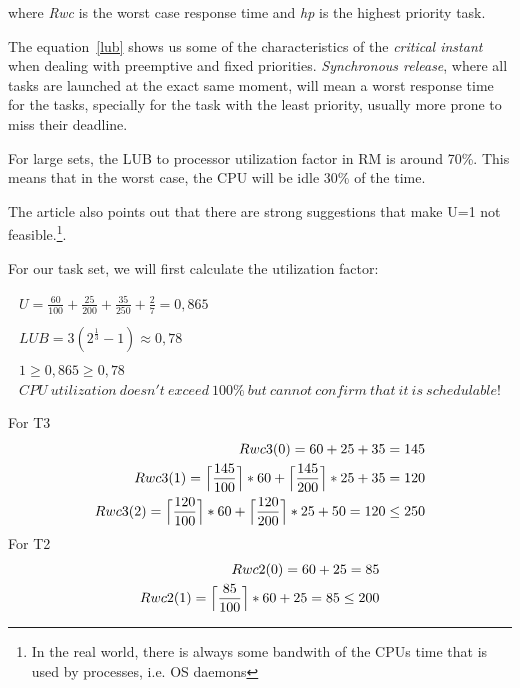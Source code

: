 \documentclass[11pt]{article}
\begin{document}
{\small where \emph{Rwc} is the worst case response time and \emph{hp} is the highest priority task.}
\medskip
\medskip

The equation~\ref{lub} shows us some of the characteristics of the \emph{critical instant} when dealing with preemptive and fixed priorities. \emph {Synchronous release}, where all tasks are launched at the exact same moment, will mean a worst response time for the tasks, specially for the task with the least priority, usually more prone to miss their deadline.

For large sets, the LUB to processor utilization factor in RM is around 70\%. This means that in the worst case, the CPU will be idle 30\% of the time.

The article also points out that there are strong suggestions that make U=1 not feasible.\footnote{In the real world, there is always some bandwith of the CPUs time that is used by processes, i.e. OS daemons}. 


For our task set, we will first calculate the utilization factor:

\begin{equation} 
\begin{split}
	U = \frac{60}{100} + \frac{25}{200} + \frac{35}{250} + \frac{2}{7} = 0,865
	\\
	\\
	LUB = 3(2^ \frac{1}{3} - 1) \approx 0,78
	\\
	\\
	1 \geq  0,865 \geq 0,78
	\\
	CPU\ utilization\ doesn't\ exceed\ 100\%\ but\ cannot\ confirm\ that\ it\ is\ schedulable!
\end{split}
\end{equation}

\noindent
For T3
\begin{equation} 
\begin{split}
	Rwc3(0) = 60 + 25 + 35 = 145
	\\
	Rwc3(1) =  \Bigl\lceil\dfrac{145}{100}\Bigr\rceil * 60 + \Bigl\lceil\dfrac{145}{200}\Bigr\rceil * 25 + 35 = 120
	\\
	Rwc3(2) =  \Bigl\lceil\dfrac{120}{100}\Bigr\rceil * 60 + \Bigl\lceil\dfrac{120}{200}\Bigr\rceil * 25 + 50 = 120 \leq 250
\end{split}
\end{equation}
For T2
\begin{equation} 
\begin{split}
	Rwc2(0) = 60 + 25  = 85
	\\
	Rwc2(1) =  \Bigl\lceil\dfrac{85}{100}\Bigr\rceil * 60 + 25 = 85 \leq 200
\end{split}
\end{equation}
\end{document}
